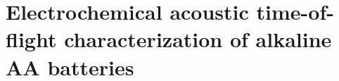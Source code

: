 
\chapter{Electrochemical acoustic time-of-flight characterization of alkaline AA batteries\label{ch:alkbw}}




